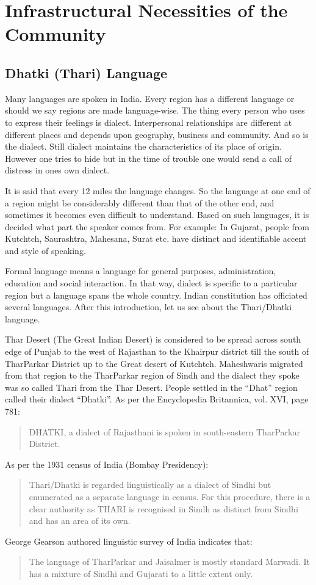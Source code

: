 \chapter{Infrastructural Necessities of the Community}
\section{Dhatki (Thari) Language}
Many languages are spoken in India. Every region has a different language or
should we say regions are made language-wise. The thing every person who uses to
express their feelings is dialect. Interpersonal relationships are different at
different places and depends upon geography, business and community. And so is
the dialect. Still dialect maintains the characteristics of its place of origin.
However one tries to hide but in the time of trouble one would send a call of
distress in ones own dialect.

It is said that every 12 miles the language changes. So the language at one end
of a region might be considerably different than that of the other end, and
sometimes it becomes even difficult to understand. Based on such languages, it
is decided what part the speaker comes from. For example: In Gujarat, people
from Kutchtch, Saurashtra, Mahesana, Surat etc. have distinct and identifiable
accent and style of speaking.

Formal language means a language for general purposes, administration, education
and social interaction. In that way, dialect is specific to a particular region
but a language spans the whole country. Indian constitution has officiated
several languages. After this introduction, let us see about the Thari/Dhatki
language.

Thar Desert (The Great Indian Desert) is considered to be spread across south
edge of Punjab to the west of Rajasthan to the Khairpur district till the south
of TharParkar District up to the Great desert of Kutchtch. Maheshwaris migrated
from that region to the TharParkar region of Sindh and the dialect they spoke
was so called Thari from the Thar Desert. People settled in the ``Dhat'' region
called their dialect ``Dhatki''. As per the Encyclopedia Britannica, vol. XVI,
page 781:
\begin{quote}
 DHATKI, a dialect of Rajasthani is spoken in south-eastern TharParkar District.
\end{quote}
As per the 1931 census of India (Bombay Presidency):
\begin{quote}
Thari/Dhatki is regarded linguistically as a dialect of Sindhi but enumerated as
a separate language in census. For this procedure, there is a clear authority as
THARI is recognised in Sindh as distinct from Sindhi and has an area of its
own.
\end{quote}
George Gearson authored linguistic survey of India indicates that:
\begin{quote}
The language of TharParkar and Jaisalmer is mostly standard Marwadi. It has a
mixture of Sindhi and Gujarati to a little extent only.
\end{quote}

